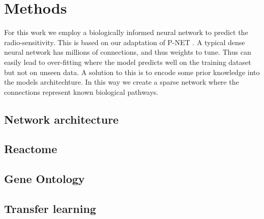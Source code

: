 \documentclass[NOTE, disdraft=true, UKenglish]{\DISCDTLATEXPATH UCLCDTDISdoc}
\begin{document}
\section{Methods}
\label{sec:method}
For this work we employ a biologically informed neural network to predict the radio-sensitivity. This is based on our adaptation of P-NET \cite{cosmin_thesis}. A typical dense neural network has millions of connections, and thus weights to tune. Thus can easily lead to over-fitting where the model predicts well on the training dataset but not on unseen data. A solution to this is to encode some prior knowledge into the models architechture. In this way we create a sparse network where the connections represent known biological pathways.
\subsection{Network architecture}
\subsection{Reactome}
\subsection{Gene Ontology}

\subsection{Transfer learning}
\end{document}
